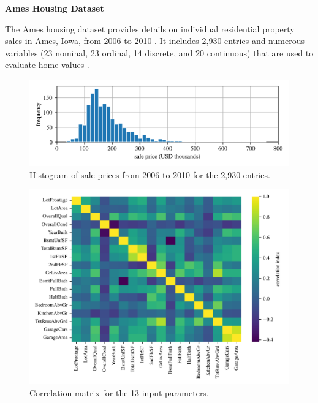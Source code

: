 \documentclass[12pt,letter]{article}
\begin{document}
\pagebreak
\begin{data}

	\textbf{Ames Housing Dataset}

	\noindent The Ames housing dataset provides details on individual residential property sales in Ames, Iowa, from 2006 to 2010 \protect\footnotemark[1]. It includes 2,930 entries and numerous variables (23 nominal, 23 ordinal, 14 discrete, and 20 continuous) that are used to evaluate home values \protect\footnotemark[2].
	
	
	\begin{figure}[H]
		\centering
		\includegraphics[width=5in]{../figures/Ames_histogram}
		\caption{Histogram of sale prices from 2006 to 2010 for the 2,930 entries.}
		\label{fig:Ames_histogram}
	\end{figure}
	
	\begin{figure}[H]
		\centering
		\includegraphics[width=5in]{../figures/Ames_housing_correlation_matirx}
		\caption{Correlation matrix for the 13 input parameters.}
		\label{fig:Ames_housing_correlation_matirx}
	\end{figure}

\end{data}
\end{document}

